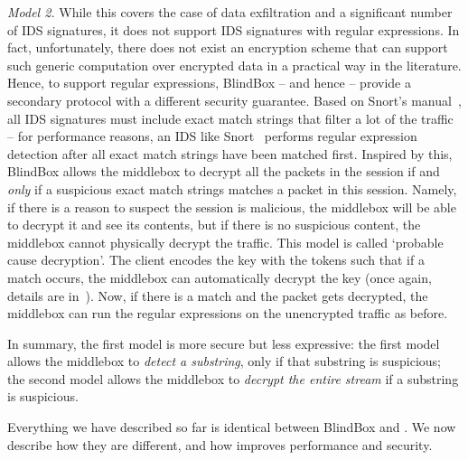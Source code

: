  {\em Model 2.}  While this covers the case of data exfiltration and a significant number of IDS signatures, it does not support  IDS signatures with regular expressions.
 In fact, unfortunately, there does not exist an encryption scheme that can support such generic computation over encrypted data in a practical way in the literature. 
  Hence, to support regular expressions, BlindBox -- and hence \sys -- provide a secondary protocol with a different security guarantee. 
  Based on Snort's manual~\cite{Snort_manual}, all  IDS signatures must include exact match strings that filter a lot of the traffic -- for performance reasons, an IDS like Snort~\cite{Snort} performs regular expression detection after all exact match strings have been matched first.
  Inspired by this, BlindBox allows the middlebox to decrypt all the packets in the session if and {\it only} if a suspicious exact match strings matches a packet in this session.
  Namely, if there is a reason to suspect the session is malicious, the middlebox will be able to decrypt it and see its contents, but if there is no suspicious content, the middlebox cannot physically decrypt the traffic.  This model is called `probable cause decryption'.
  The client encodes the key with the tokens such that if a match occurs, the middlebox can automatically decrypt the key (once again, details are in~\cite{blindbox}).
  Now, if there is a match and the packet gets decrypted, the middlebox can run the regular expressions on the unencrypted traffic as before. 
  
  
  In summary, the first model is more secure but less expressive: 
  the first model allows the middlebox to {\it detect a substring}, only if that substring is suspicious;
  the second model allows the middlebox to {\it decrypt the entire stream} if a substring is suspicious.
  
  Everything we have described so far is identical between BlindBox and \sys. We now describe how they are different, and how \sys improves performance and security.

